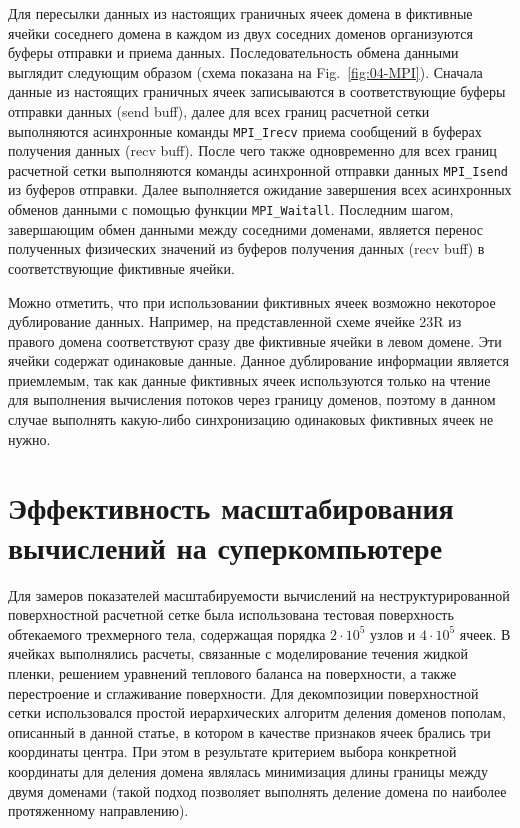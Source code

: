 \documentclass[
11pt,%
tightenlines,%
twoside,%
onecolumn,%
nofloats,%
nobibnotes,%
nofootinbib,%
superscriptaddress,%
noshowpacs,%
centertags]%
{revtex4}
\begin{document}
Для пересылки данных из настоящих граничных ячеек домена в фиктивные ячейки соседнего домена в каждом из двух соседних доменов организуются буферы отправки и приема данных.
Последовательность обмена данными выглядит следующим образом (схема показана на Fig.~\ref{fig:04-MPI}).
Сначала данные из настоящих граничных ячеек записываются в соответствующие буферы отправки данных (send buff), далее для всех границ расчетной сетки выполняются асинхронные команды \texttt{MPI\_Irecv} приема сообщений в буферах получения данных (recv buff).
После чего также одновременно для всех границ расчетной сетки выполняются команды асинхронной отправки данных \texttt{MPI\_Isend} из буферов отправки.
Далее выполняется ожидание завершения всех асинхронных обменов данными с помощью функции \texttt{MPI\_Waitall}.
Последним шагом, завершающим обмен данными между соседними доменами, является перенос полученных физических значений из буферов получения данных (recv buff) в соответствующие фиктивные ячейки.

Можно отметить, что при использовании фиктивных ячеек возможно некоторое дублирование данных.
Например, на представленной схеме ячейке 23R из правого домена соответствуют сразу две фиктивные ячейки в левом домене.
Эти ячейки содержат одинаковые данные.
Данное дублирование информации является приемлемым, так как данные фиктивных ячеек используются только на чтение для выполнения вычисления потоков через границу доменов, поэтому в данном случае выполнять какую-либо синхронизацию одинаковых фиктивных ячеек не нужно.

\section{Эффективность масштабирования вычислений на суперкомпьютере}

Для замеров показателей масштабируемости вычислений на неструктурированной поверхностной расчетной сетке была использована тестовая поверхность обтекаемого трехмерного тела, содержащая порядка $2 \cdot 10^5$ узлов и $4 \cdot 10^5$ ячеек.
В ячейках выполнялись расчеты, связанные с моделирование течения жидкой пленки, решением уравнений теплового баланса на поверхности, а также перестроение и сглаживание поверхности.
Для декомпозиции поверхностной сетки использовался простой иерархических алгоритм деления доменов пополам, описанный в данной статье, в котором в качестве признаков ячеек брались три координаты центра.
При этом в результате критерием выбора конкретной координаты для деления домена являлась минимизация длины границы между двумя доменами (такой подход позволяет выполнять деление домена по наиболее протяженному направлению).
\end{document}
